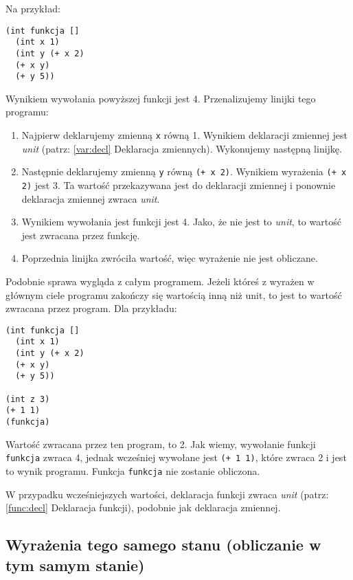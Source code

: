 \documentclass{article}
\begin{document}
Na przykład:

\begin{lstlisting}
(int funkcja []
  (int x 1)
  (int y (+ x 2)
  (+ x y)
  (+ y 5))
\end{lstlisting}

Wynikiem wywołania powyższej funkcji jest 4. Przenalizujemy linijki tego programu:

\begin{enumerate}
    \item Najpierw deklarujemy zmienną \texttt{x} równą 1. Wynikiem deklaracji zmiennej jest \textit{unit} (patrz: \ref{var:decl} Deklaracja zmiennych). Wykonujemy następną linijkę.
    \item Następnie deklarujemy zmienną \texttt{y} równą \texttt{(+ x 2)}. Wynikiem wyrażenia \texttt{(+ x 2)} jest 3. Ta wartość przekazywana jest do deklaracji zmiennej i ponownie deklaracja zmiennej zwraca \textit{unit}.
    \item Wynikiem wywołania jest funkcji jest 4. Jako, że nie jest to \textit{unit}, to wartość jest zwracana przez funkcję.
    \item Poprzednia linijka zwróciła wartość, więc wyrażenie nie jest obliczane.
\end{enumerate}

Podobnie sprawa wygląda z całym programem. Jeżeli któreś z wyrażen w głównym ciele programu zakończy się wartością inną niż unit, to jest to wartość zwracana przez program. Dla przykładu:

\begin{lstlisting}
(int funkcja []
  (int x 1)
  (int y (+ x 2)
  (+ x y)
  (+ y 5))

(int z 3)  
(+ 1 1)
(funkcja)
\end{lstlisting}

Wartość zwracana przez ten program, to 2. Jak wiemy, wywołanie funkcji \texttt{funkcja} zwraca 4, jednak wcześniej wywołane jest \texttt{(+ 1 1)}, które zwraca 2 i jest to wynik programu. Funkcja \texttt{funkcja} nie zostanie obliczona.

W przypadku wcześniejszych wartości, deklaracja funkcji zwraca \textit{unit} (patrz: \ref{func:decl} Deklaracja funkcji), podobnie jak deklaracja zmiennej.

\subsection{Wyrażenia tego samego stanu (obliczanie w tym samym stanie)}\label{same-state}
\end{document}
